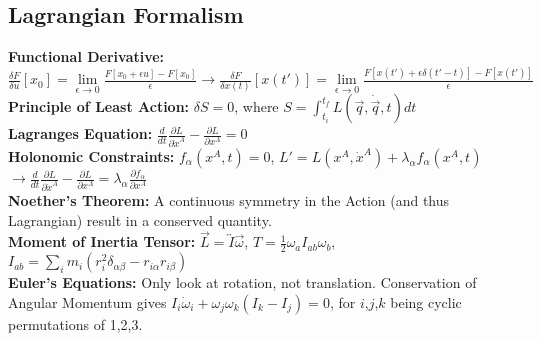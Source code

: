 \documentclass[12pt]{extarticle}
\begin{document}
\subsection*{Lagrangian Formalism}
\textbf{Functional Derivative:} $\frac{\delta F}{\delta u}[x_0] = \lim\limits_{\epsilon \rightarrow 0} \frac{F[x_0+\epsilon u] - F[x_0]}{\epsilon} \rightarrow \frac{\delta F}{\delta x(t)}[x(t')] = \lim\limits_{\epsilon \rightarrow 0} \frac{F[x(t')+\epsilon \delta(t'-t)] - F[x(t')]}{\epsilon}$ \\
\textbf{Principle of Least Action:} $\delta S = 0$, where $S=\int_{t_i}^{t_f} L(\vec{q},\dot{\vec{q}},t) dt$ \\
\textbf{Lagranges Equation:} $\frac{d}{dt}\frac{\partial L}{\partial \dot{x}^A}-\frac{\partial L}{\partial x^A} = 0$ \\
\textbf{Holonomic Constraints: } $f_\alpha(x^A,t) = 0$, $L' = L(x^A,\dot{x}^A) + \lambda_\alpha f_\alpha(x^A,t)$ $\rightarrow \frac{d}{dt}\frac{\partial L}{\partial \dot{x}^A}-\frac{\partial L}{\partial x^A} = \lambda_\alpha \frac{\partial f_\alpha}{\partial x^A}$ \\
\textbf{Noether's Theorem: } A continuous symmetry in the Action (and thus Lagrangian) result in a conserved quantity. \\
\textbf{Moment of Inertia Tensor: } $\vec{L} = \overleftrightarrow{I} \vec{\omega}$, $T = \frac{1}{2} \omega_a I_{ab} \omega_b$, $I_{ab} = \sum_i m_i(r_i^2\delta_{\alpha\beta} - r_{i\alpha}r_{i\beta})$ \\
\textbf{Euler's Equations:} Only look at rotation, not translation. Conservation of Angular Momentum gives $I_i\dot{\omega}_i +\omega_j\omega_k(I_k-I_j) = 0$, for $i$,$j$,$k$ being cyclic permutations of 1,2,3. \\
\end{document}
